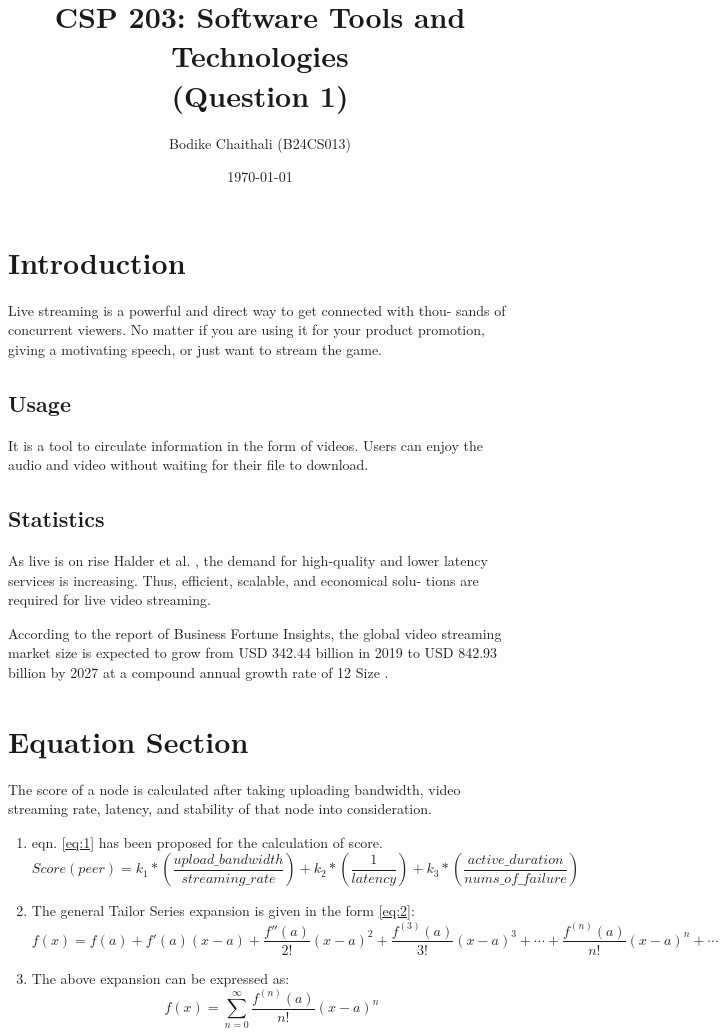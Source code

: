\documentclass[11pt]{article}
\title{CSP 203: Software Tools and Technologies \\
	(Question 1)}
\author{Bodike Chaithali (B24CS013)}
\date{\today}
\begin{document}
	\maketitle
	\section{Introduction}
	Live streaming is a powerful and direct way to get connected with thou-
	sands of concurrent viewers. No matter if you are using it for your product
	promotion, giving a motivating speech, or just want to stream the game.
	\subsection{Usage}
	It is a tool to circulate information in the form of videos. Users can enjoy
	the audio and video without waiting for their file to download.
	\subsection{Statistics}
	As live is on rise Halder et al. \cite{size2020video}, the demand for high-quality and lower
	latency services is increasing. Thus, efficient, scalable, and economical solu-
	tions are required for live video streaming.
	
	
	According to the report of Business Fortune Insights, the global video
	streaming market size is expected to grow from USD 342.44 billion in 2019
	to USD 842.93 billion by 2027 at a compound annual growth rate of 12
	Size \cite{halder2021fybrrstream}.
	\section{Equation Section}
	The score of a node is calculated after taking uploading bandwidth, video
	streaming rate, latency, and stability of that node into consideration.
	\begin{enumerate}
		\item eqn. \eqref{eq:1} has been proposed for the calculation of score.
		\begin{equation}\label{eq:1}
			Score(peer)=k_1*(\frac{upload\_bandwidth}{streaming\_rate})+k_2*(\frac{1}{latency})+k_3*(\frac{active\_duration}{nums\_of\_failure})
		\end{equation}
	\item The general Tailor Series expansion is given in the form \eqref{eq:2}:
	\begin{equation}\label{eq:2}
		f(x)=f(a)+f'(a)(x-a)+\frac{f''(a)}{2!}(x-a)^2+\frac{f^{(3)}(a)}{3!}(x-a)^3+\cdots+\frac{f^{(n)}(a)}{n!}(x-a)^n+\cdots
	\end{equation}
	\item  The above expansion can be expressed as:
	\begin{equation*}
		f(x)=\sum_{n=0}^{\infty} \frac{f^{(n)}(a)}{n!}(x-a)^n
	\end{equation*}
	\end{enumerate}
\end{document}
